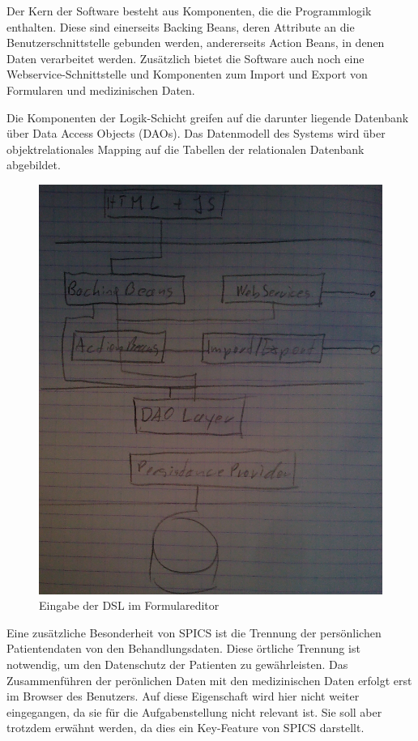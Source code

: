 Der Kern der Software besteht aus Komponenten, die die Programmlogik enthalten. Diese sind einerseits Backing Beans, deren Attribute an die Benutzerschnittstelle gebunden werden, andererseits Action Beans, in denen Daten verarbeitet werden. Zusätzlich bietet die Software auch noch eine Webservice-Schnittstelle und Komponenten zum Import und Export von Formularen und medizinischen Daten.

Die Komponenten der Logik-Schicht greifen auf die darunter liegende Datenbank über Data Access Objects (DAOs). Das Datenmodell des Systems wird über objektrelationales Mapping auf die Tabellen der relationalen Datenbank abgebildet.

\begin{figure}[h]
\begin{center}
\includegraphics[scale=0.3]{figures/spics_architektur}
\caption{Eingabe der DSL im Formulareditor}

\label{abb_spics_architektur}
\end{center}
\end{figure}

Eine zusätzliche Besonderheit von SPICS ist die Trennung der persönlichen Patientendaten von den Behandlungsdaten. Diese örtliche Trennung ist notwendig, um den Datenschutz der Patienten zu gewährleisten. Das Zusammenführen der perönlichen Daten mit den medizinischen Daten erfolgt erst im Browser des Benutzers. Auf diese Eigenschaft wird hier nicht weiter eingegangen, da sie für die Aufgabenstellung nicht relevant ist. Sie soll aber trotzdem erwähnt werden, da dies ein Key-Feature von SPICS darstellt.

